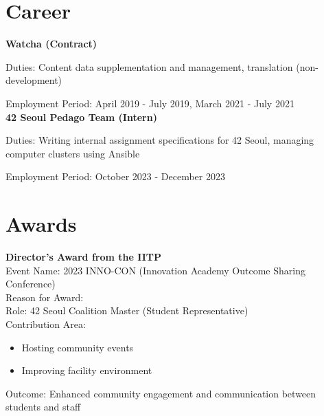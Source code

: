\documentclass[11pt, a4paper]{article}
\begin{document}
\section{Career}
\textbf{Watcha (Contract)}

Duties: Content data supplementation and management, translation (non-development)

Employment Period: April 2019 - July 2019, March 2021 - July 2021\\
\textbf{42 Seoul Pedago Team (Intern)}

Duties: Writing internal assignment specifications for 42 Seoul, managing computer clusters using Ansible

Employment Period: October 2023 - December 2023

\section{Awards}
\textbf{Director's Award from the IITP}\\
\hspace*{0.5cm}Event Name: 2023 INNO-CON (Innovation Academy Outcome Sharing Conference)\\
\hspace*{0.5cm}Reason for Award:\\
\hspace*{1cm}Role: 42 Seoul Coalition Master (Student Representative)\\
\hspace*{1cm}Contribution Area:
\begin{itemize}
    \begin{itemize}
        \item Hosting community events
        \item Improving facility environment
    \end{itemize}
\end{itemize}
\hspace*{0.5cm}Outcome: Enhanced community engagement and communication between students and staff
\end{document}

